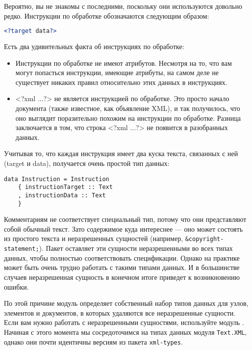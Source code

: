 \begin{remark}
Вероятно, вы не знакомы с последними, поскольку они используются довольно редко. Инструкции по обработке обозначаются следующим образом:

\begin{lstlisting}[language=XML]
<?target data?>
\end{lstlisting}

Есть два удивительных факта об инструкциях по обработке:

\begin{itemize}
\item Инструкции по обработке не имеют атрибутов. Несмотря на то, что вам могут попасться инструкции, имеющие атрибуты, на самом деле не существует никаких правил относительно этих данных в инструкциях. %
\item <?xml ...?> не является инструкцией по обработке. Это просто начало документа (также известное, как объявление XML), и так получилось, что оно выглядит поразительно похожим на инструкции по обработке. Разница заключается в том, что строка <?xml ...?> не появится в разобранных данных.
\end{itemize}

\end{remark}

Учитывая то, что каждая инструкция имеет два куска текста, связанных с ней (target и data), получается очень простой тип данных:

\begin{lstlisting}
data Instruction = Instruction
    { instructionTarget :: Text
    , instructionData :: Text
    }
\end{lstlisting}

Комментариям не соответствует специальный тип, потому что они представляют собой обычный текст. Зато содержимое куда интереснее --- оно может состоять из простого текста и неразрешенных сущностей (например, \lstinline!&copyright-statement;!). Пакет  оставляет эти сущности неразрешенными во всех типах данных, чтобы полностью соответствовать спецификации. Однако на практике может быть очень трудно работать с такими типами данных. И в большинстве случаев неразрешенная сущность в конечном итоге приведет к возникновению ошибки.

По этой причине модуль  определяет собственный набор типов данных для узлов, элементов и документов, в которых удаляются все неразрешенные сущности. Если вам нужно работать с неразрешенными сущностями, используйте модуль . Начиная с этого момента мы сосредоточимся на типах данных модуля \lstinline!Text.XML!, однако они почти идентичны версиям из пакета \lstinline!xml-types!.

